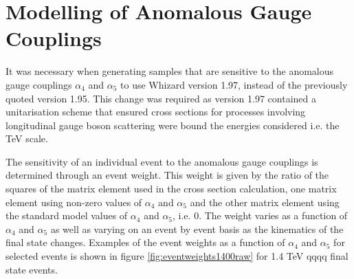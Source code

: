 
\section{Modelling of Anomalous Gauge Couplings}
\label{sec:modellingofanomalouscouplings}
It was necessary when generating samples that are sensitive to the anomalous gauge couplings $\alpha_{4}$ and $\alpha_{5}$ to use Whizard version 1.97, instead of the previously quoted version 1.95.  This change was required as version 1.97 contained a unitarisation scheme that ensured cross sections for processes involving longitudinal gauge boson scattering were bound the energies considered i.e. the TeV scale.  

The sensitivity of an individual event to the anomalous gauge couplings is determined through an event weight. This weight is given by the ratio of the squares of the matrix element used in the cross section calculation, one matrix element using non-zero values of $\alpha_{4}$ and $\alpha_{5}$ and the other matrix element using the standard model values of $\alpha_{4}$ and $\alpha_{5}$, i.e. 0.  The weight varies as a function of $\alpha_{4}$ and $\alpha_{5}$ as well as varying on an event by event basis as the kinematics of the final state changes.  Examples of the event weights as a function of $\alpha_{4}$ and $\alpha_{5}$ for selected events is shown in figure \ref{fig:eventweights1400raw} for 1.4 TeV \nu{\nu}qqqq final state events.

